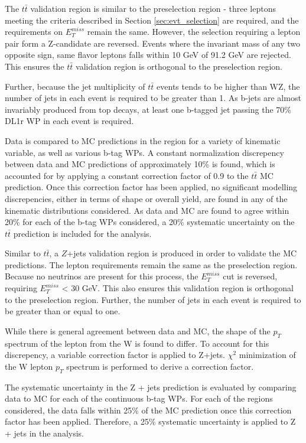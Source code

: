 The $t\bar{t}$ validation region is similar to the preselection region - three leptons meeting the criteria described in Section \ref{sec:evt_selection} are required, and the requirements on $E_T^{miss}$ remain the same. However, the selection requiring a lepton pair form a Z-candidate are reversed. Events where the invariant mass of any two opposite sign, same flavor leptons falls within 10 GeV of 91.2 GeV are rejected. This ensures the $t\bar{t}$ validation region is orthogonal to the preselection region. 

Further, because the jet multiplicity of $t\bar{t}$ events tends to be higher than WZ, the number of jets in each event is required to be greater than 1. As b-jets are almost invariably produced from top decays, at least one b-tagged jet passing the 70\% DL1r WP in each event is required. 

Data is compared to MC predictions in the region for a variety of kinematic variable, as well as various b-tag WPs. A constant normalization discrepency between data and MC predictions of approximately 10\% is found, which is accounted for by applying a constant correction factor of 0.9 to the $t\bar{t}$ MC prediction. Once this correction factor has been applied, no significant modelling discrepencies, either in terms of shape or overall yield, are found in any of the kinematic distributions considered. As data and MC are found to agree within 20\% for each of the b-tag WPs considered, a 20\% systematic uncertainty on the $t\bar{t}$ prediction is included for the analysis.

Similar to $t\bar{t}$, a $Z$+jets validation region is produced in order to validate the MC predictions. The lepton requirements remain the same as the preselection region. Because no neutrinos are present for this process, the $E_T^{miss}$ cut is reversed, requiring $E_T^{miss}$ < 30 GeV. This also ensures this validation region is orthogonal to the preselection region. Further, the number of jets in each event is required to be greater than or equal to one.

While there is general agreement between data and MC, the shape of the $p_T$ spectrum of the lepton from the W is found to differ. To account for this discrepency, a variable correction factor is applied to Z+jets. $\chi^2$ minimization of the W lepton $p_T$ spectrum is performed to derive a correction factor.

The systematic uncertainty in the Z + jets prediction is evaluated by comparing data to MC for each of the continuous b-tag WPs. For each of the regions considered, the data falls within 25\% of the MC prediction once this correction factor has been applied. Therefore, a 25\% systematic uncertainty is applied to Z + jets in the analysis.

